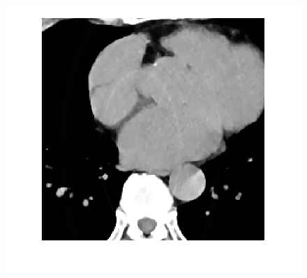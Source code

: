 \documentclass[hyperref]{ctexart}
\begin{document}
{\begin{figure}[htbp]
{				\includegraphics[scale=0.2]{333-1.png}
			}
			\quad
			\quad
			\subfigure[pic5.]{
}
\end{figure}}
\end{document}
